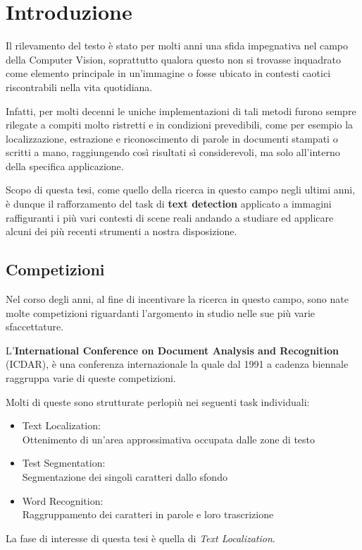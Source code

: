 \chapter{Introduzione}

Il rilevamento del testo è stato per molti anni una sfida impegnativa nel campo della Computer Vision, soprattutto qualora questo non si trovasse inquadrato come elemento principale in un'immagine o fosse ubicato in contesti caotici riscontrabili nella vita quotidiana.\par
Infatti, per molti decenni le uniche implementazioni di tali metodi furono sempre rilegate a compiti molto ristretti e in condizioni prevedibili, come per esempio la localizzazione, estrazione e riconoscimento di parole in documenti stampati o scritti a mano, raggiungendo così risultati sì considerevoli, ma solo all'interno della specifica applicazione.\par
Scopo di questa tesi, come quello della ricerca in questo campo negli ultimi anni, è dunque il rafforzamento del task di \textbf{text detection} applicato a immagini raffiguranti i più vari contesti di scene reali andando a studiare ed applicare alcuni dei più recenti strumenti a nostra disposizione.\par

\vspace{10pt}

\section{Competizioni}
Nel corso degli anni, al fine di incentivare la ricerca in questo campo, sono nate molte competizioni riguardanti l'argomento in studio nelle sue più varie sfaccettature.\par
L'\textbf{International Conference on Document Analysis and Recognition}~\cite{ICDAR} (ICDAR), è una conferenza internazionale la quale dal 1991 a cadenza biennale raggruppa varie di queste competizioni.\par
Molti di queste sono strutturate perlopiù nei seguenti task individuali:
\begin{itemize}
	\item Text Localization: \\
		Ottenimento di un'area approssimativa occupata dalle zone di testo
	\item Test Segmentation: \\
		Segmentazione dei singoli caratteri dallo sfondo
	\item Word Recognition: \\
		Raggruppamento dei caratteri in parole e loro trascrizione
\end{itemize}
\vspace{4pt}
La fase di interesse di questa tesi è quella di \textit{Text Localization}.

